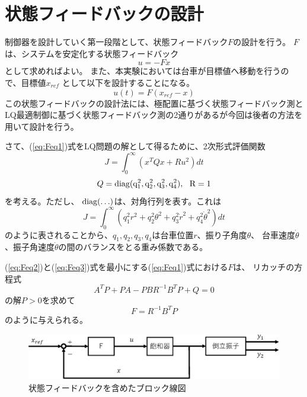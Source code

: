 \section{状態フィードバックの設計}
	制御器を設計していく第一段階として、状態フィードバック$F$の設計を行う。
	$F$は、システムを安定化する状態フィードバック
	\[
		u = -Fx
	\]
	として求めればよい。
	また、本実験においては台車が目標値へ移動を行うので、目標値$x_{ref}$
	として以下を設計することになる。
	\begin{equation}
		u(t) = F(x_{ref} - x)
		\label{eq:Feq1}
	\end{equation}
	この状態フィードバックの設計法には、極配置に基づく状態フィードバック測と
	LQ最適制御に基づく状態フィードバック測の2通りがあるが今回は後者の方法を用いて設計を行う。
	\par
	さて、(\ref{eq:Feq1})式をLQ問題の解として得るために、2次形式評価関数
	\begin{equation}
		J = \int_{0}^{\infty}(x^{T}Qx+Ru^{2})dt
		\label{eq:Feq2}
	\end{equation}
	\begin{equation}
		Q = \rm{diag}(q_{1}^2,q_{2}^2,q_{3}^2,q_{4}^2),\ \ R = 1
		\label{eq:Feq3}
	\end{equation}
	を考える。ただし、 $\rm{diag}(\ldots)$は、対角行列を表す。これは
	\begin{equation}
		J=\int_{0}^{\infty}(q_{1}^{2}r^{2}+q_{2}^{2}\theta^{2}
		+q_{3}^{2}\dot{r}^{2}+q_{4}^{2}\dot{\theta}^{2})dt
	\end{equation}
	のように表されることから、$q_1,q_2,q_3,q_4$は台車位置$r$、振り子角度$\theta$、
	台車速度$\dot{\theta}$、振子角速度$\dot{\theta}$の間のバランスをとる重み係数である。
	\par
	(\ref{eq:Feq2})と(\ref{eq:Feq3})式を最小にする(\ref{eq:Feq1})式における$F$は、
	リカッチの方程式
	\[
		A^{T}P+PA-PBR^{-1}B^{T}P+Q = 0
	\]
	の解$P>0$を求めて
	\[
		F = R^{-1}B^{T}P
	\]
	のように与えられる。
	\begin{figure}[h]
		\centering
		\includegraphics[width=0.8\linewidth]{gazo/controll_F.eps}
		\caption{状態フィードバックを含めたブロック線図}
		\label{image:cF}
	\end{figure}
